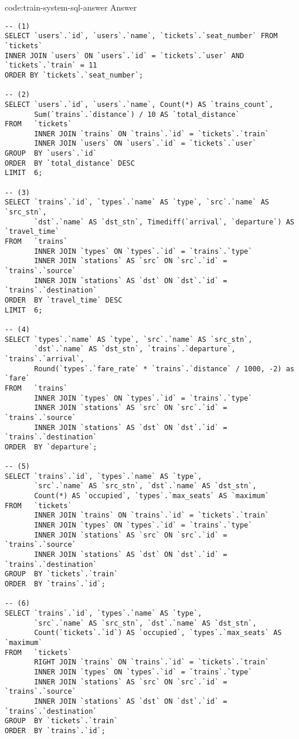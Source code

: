 \begin{codeenv}{code:train-system-sql-answer}{ Answer}\begin{verbatim}
-- (1)
SELECT `users`.`id`, `users`.`name`, `tickets`.`seat_number` FROM `tickets`
INNER JOIN `users` ON `users`.`id` = `tickets`.`user` AND `tickets`.`train` = 11
ORDER BY `tickets`.`seat_number`;

-- (2)
SELECT `users`.`id`, `users`.`name`, Count(*) AS `trains_count`,
       Sum(`trains`.`distance`) / 10 AS `total_distance`
FROM   `tickets`
       INNER JOIN `trains` ON `trains`.`id` = `tickets`.`train`
       INNER JOIN `users` ON `users`.`id` = `tickets`.`user`
GROUP  BY `users`.`id`
ORDER  BY `total_distance` DESC
LIMIT  6;

-- (3)
SELECT `trains`.`id`, `types`.`name` AS `type`, `src`.`name` AS `src_stn`,
       `dst`.`name` AS `dst_stn`, Timediff(`arrival`, `departure`) AS `travel_time`
FROM   `trains`
       INNER JOIN `types` ON `types`.`id` = `trains`.`type`
       INNER JOIN `stations` AS `src` ON `src`.`id` = `trains`.`source`
       INNER JOIN `stations` AS `dst` ON `dst`.`id` = `trains`.`destination`
ORDER  BY `travel_time` DESC
LIMIT  6;

-- (4)
SELECT `types`.`name` AS `type`, `src`.`name` AS `src_stn`,
       `dst`.`name` AS `dst_stn`, `trains`.`departure`, `trains`.`arrival`,
       Round(`types`.`fare_rate` * `trains`.`distance` / 1000, -2) as `fare`
FROM   `trains`
       INNER JOIN `types` ON `types`.`id` = `trains`.`type`
       INNER JOIN `stations` AS `src` ON `src`.`id` = `trains`.`source`
       INNER JOIN `stations` AS `dst` ON `dst`.`id` = `trains`.`destination`
ORDER  BY `departure`;

-- (5)
SELECT `trains`.`id`, `types`.`name` AS `type`,
       `src`.`name` AS `src_stn`, `dst`.`name` AS `dst_stn`,
       Count(*) AS `occupied`, `types`.`max_seats` AS `maximum`
FROM   `tickets`
       INNER JOIN `trains` ON `trains`.`id` = `tickets`.`train`
       INNER JOIN `types` ON `types`.`id` = `trains`.`type`
       INNER JOIN `stations` AS `src` ON `src`.`id` = `trains`.`source`
       INNER JOIN `stations` AS `dst` ON `dst`.`id` = `trains`.`destination`
GROUP  BY `tickets`.`train`
ORDER  BY `trains`.`id`;

-- (6)
SELECT `trains`.`id`, `types`.`name` AS `type`,
       `src`.`name` AS `src_stn`, `dst`.`name` AS `dst_stn`,
       Count(`tickets`.`id`) AS `occupied`, `types`.`max_seats` AS `maximum`
FROM   `tickets`
       RIGHT JOIN `trains` ON `trains`.`id` = `tickets`.`train`
       INNER JOIN `types` ON `types`.`id` = `trains`.`type`
       INNER JOIN `stations` AS `src` ON `src`.`id` = `trains`.`source`
       INNER JOIN `stations` AS `dst` ON `dst`.`id` = `trains`.`destination`
GROUP  BY `tickets`.`train`
ORDER  BY `trains`.`id`;
\end{verbatim}
\end{codeenv}

